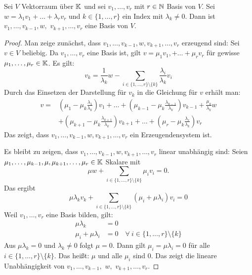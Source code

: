 \begin{lm}
	Sei $ V $ Vektorraum über $ \mathbb K $ und sei $ v_1, \ldots, v_r $ mit $ r \in \mathbb N $ Basis von $ V $. Sei $ w = \lambda_1v_1 + \ldots + \lambda_rv_r $ und $ k \in \{ 1, \ldots, r \} $ ein Index mit $ \lambda_k \neq 0 $. Dann ist $ v_1, \ldots, v_{k-1}, w, $ $ v_{k+1}, \ldots, v_r $ eine Basis von $ V $.
\end{lm}
\begin{proof}
	Man zeige zunächst, dass $ v_1, \ldots, v_{k-1}, w, v_{k+1}, \ldots, v_r $ erzeugend sind: Sei $ v \in V $ beliebig. Da $ v_1, \ldots, v_r $ eine Basis ist, gilt $ v = \mu_1v_1, + \ldots + \mu_rv_r $ für gewisse $ \mu_1, \ldots, \mu_r \in \mathbb K $. Es gilt:
	\begin{equation*}
		v_k = \frac{1}{\lambda_k}w - \sum_{i \in \{ 1, \ldots, r \} \setminus \{ k \}}\frac{\lambda_i}{\lambda_k}v_i
	\end{equation*}
	Durch das Einsetzen der Darstellung für $ v_k $ in die Gleichung für $ v $ erhält man:
	\begin{align*}
		v = &\left( \mu_1 - \mu_k \frac{\lambda_1}{\lambda_k} \right)v_1 + \ldots + \left( \mu_{k-1} - \mu_k \frac{\lambda_{k-1}}{\lambda_k} \right)v_{k-1} + \frac{\mu_k}{\lambda_k}w \\
		&+ \left( \mu_{k+1} - \mu_k \frac{\lambda_{k+1}}{\lambda_k} \right)v_{k+1} + \ldots + \left( \mu_r - \mu_k \frac{\lambda_r}{\lambda_k} \right)v_r
	\end{align*}
	Das zeigt, dass $ v_1, \ldots, v_{k-1}, w, v_{k+1}, \ldots, v_r $ ein Erzeugendensystem ist.
	
	Es bleibt zu zeigen, dass $ v_1, \ldots, v_{k-1}, w, v_{k+1}, \ldots, v_r $ linear unabhängig sind: Seien $ \mu_1, \ldots, \mu_{k-1}, \mu, \mu_{k+1}, \ldots, \mu_r \in \mathbb K $ Skalare mit
	\begin{equation*}
		\mu w + \sum_{i \in \{ 1, \ldots, r \} \setminus \{ k \}} \mu_iv_i = 0.
	\end{equation*}
	Das ergibt
	\begin{equation*}
		\mu\lambda_kv_k + \sum_{i \in \{ 1, \ldots, r \} \setminus \{ k \}}(\mu_i + \mu\lambda_i)v_i = 0
	\end{equation*}
	Weil $ v_1, \ldots, v_r $ eine Basis bilden, gilt:
	\begin{align*}
		\mu\lambda_k &= 0\\
		\mu_i + \mu\lambda_i &= 0 \quad \forall\: i \in \{ 1, \ldots, r \} \setminus \{ k \}
	\end{align*}
	Aus $ \mu\lambda_k = 0 $ und $ \lambda_k \neq 0 $ folgt $ \mu = 0 $. Dann gilt $ \mu_i = \mu\lambda_i = 0 $ für alle $ i \in \{ 1, \ldots, r \} \setminus \{ k \} $. Das heißt: $ \mu $ und alle $ \mu_i $ sind 0. Das zeigt die lineare Unabhängigkeit von $ v_1, \ldots, v_{k-1}, $ $ w, $ $ v_{k+1}, \ldots, v_r $.
\end{proof}

